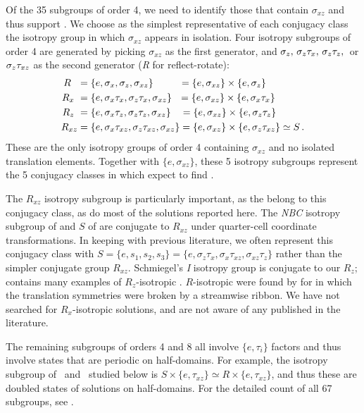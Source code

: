 Of the 35 subgroups of order 4, we need to identify those that
contain $\sigma_{xz}$ and thus support {\eqva}. We choose
as the simplest representative of each conjugacy class the isotropy
group in which $\sigma_{xz}$ appears in isolation.
Four isotropy subgroups of order 4 are generated by picking
$\sigma_{xz}$ as the first generator, and $\sigma_{z},\, \sigma_{z}
\tau_{x},\, \sigma_{z} \tau_{z},\,$ or $\sigma_{z} \tau_{xz}$
as the second generator (\emph{R} for reflect-rotate):
\begin{align}
 R~~  &=  \{e, \sigma_x, \sigma_z, \sigma_{xz}\}
      ~~~~~~~\; = \{e,\sigma_{xz}\} \times \{e,\sigma_{z}\} \nonumber\\
 R_x~ &=  \{e,\sigma_x \tau_{x}, \sigma_z \tau_{x}, \sigma_{xz}\}
      ~~ = \{e,\sigma_{xz}\} \times \{e,\sigma_{x}\tau_{x}\}
        \label{subg4RR} \\
 R_z~ &=  \{e, \sigma_x \tau_{z}, \sigma_z \tau_{z}, \sigma_{xz}\}
      ~~\; = \{e,\sigma_{xz}\} \times \{e,\sigma_{z}\tau_{z}\}
        \nonumber\\
 R_{xz} &= \{e, \sigma_x \tau_{xz}, \sigma_z \tau_{xz}, \sigma_{xz}\}
        = \{e,\sigma_{xz}\} \times \{e,\sigma_{z}\tau_{xz}\}
        \simeq S \,. \nonumber
\end{align}
These are the only isotropy groups of order 4 containing $\sigma_{xz}$
and no isolated translation elements. Together with $\{e,\sigma_{xz}\}$,
these 5 isotropy subgroups represent the 5 conjugacy classes in
which expect to find {\eqva}.

The $R_{xz}$ isotropy subgroup is particularly important, as the
{\eqva} belong to this conjugacy class, as do
most of the solutions reported here. The \emph{NBC} isotropy subgroup of
 and $S$ of  are conjugate to $R_{xz}$ under
quarter-cell coordinate transformations. In keeping with previous literature,
we often represent this conjugacy class with
$S = \{e, s_1, s_2, s_3\} = \{e, \sigma_z \tau_x, \sigma_x \tau_{xz},
\sigma_{xz} \tau_z\}$ rather than the simpler conjugate group $R_{xz}$.
Schmiegel's \emph{I} isotropy group is conjugate to our $R_{z}$; 
contains many examples of $R_z$-isotropic \eqva. $R$-isotropic {\eqva} were found
by  for {\pCf} in which the translation symmetries
were broken by a streamwise ribbon. We have not searched for $R_x$-isotropic
solutions, and are not aware of any published in the literature.

The remaining subgroups of orders 4 and 8 all involve $\{e,\tau_i\}$ factors
and thus involve states that are periodic on half-domains.
For example, the isotropy subgroup of \tEQsev\ and \tEQeight\ studied below is
$S  \times \{e, \tau_{xz}\} \simeq R  \times \{e, \tau_{xz}\}$,
and thus these are doubled states of solutions on half-domains. For
the detailed count of all 67 subgroups, see .


